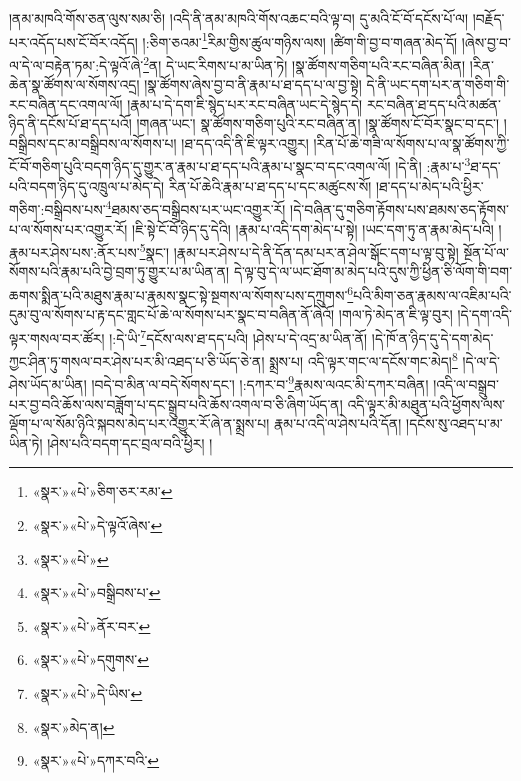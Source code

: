 །ནམ་མཁའི་གོས་ཅན་ལུས་སམ་ཅི། །འདི་ནི་ནམ་མཁའི་གོས་འཆང་བའི་ལྟ་བ། དུ་མའི་ངོ་བོ་དངོས་པོ་ལ། །བརྗོད་པར་འདོད་པས་ངོ་བོར་འདོད། །:ཅིག་ཅའམ་\footnote{«སྣར་»«པེ་»ཅིག་ཅར་རམ་}རིམ་གྱིས་ཚུལ་གཉིས་ལས། །ཚིག་གི་བྱ་བ་གཞན་མེད་དོ། །ཞེས་བྱ་བ་ལ་དེ་ལ་བརྟེན་ཏམ་:དེ་ལྟའོ་ཞེ་\footnote{«སྣར་»«པེ་»དེ་ལྟའོ་ཞེས་}ན། དེ་ཡང་རིགས་པ་མ་ཡིན་ཏེ། །སྣ་ཚོགས་གཅིག་པའི་རང་བཞིན་མིན། །རིན་ཆེན་སྣ་ཚོགས་ལ་སོགས་འདྲ། །སྣ་ཚོགས་ཞེས་བྱ་བ་ནི་རྣམ་པ་ཐ་དད་པ་ལ་བྱ་སྟེ། དེ་ནི་ཡང་དག་པར་ན་གཅིག་གི་རང་བཞིན་དང་འགལ་ལོ། །རྣམ་པ་དེ་དག་ཇི་སྙེད་པར་རང་བཞིན་ཡང་དེ་སྙེད་དེ། རང་བཞིན་ཐ་དད་པའི་མཚན་ཉིད་ནི་དངོས་པོ་ཐ་དད་པའོ། །གཞན་ཡང་། སྣ་ཚོགས་གཅིག་པུའི་རང་བཞིན་ན། །སྣ་ཚོགས་ངོ་བོར་སྣང་བ་དང་། །བསྒྲིབས་དང་མ་བསྒྲིབས་ལ་སོགས་པ། །ཐ་དད་འདི་ནི་ཇི་ལྟར་འགྱུར། །རིན་པོ་ཆེ་གཟི་ལ་སོགས་པ་ལ་སྣ་ཚོགས་ཀྱི་ངོ་བོ་གཅིག་པུའི་བདག་ཉིད་དུ་གྱུར་ན་རྣམ་པ་ཐ་དད་པའི་རྣམ་པ་སྣང་བ་དང་འགལ་ལོ། །དེ་ནི། :རྣམ་པ་\footnote{«སྣར་»«པེ་»}ཐ་དད་པའི་བདག་ཉིད་དུ་འཁྲུལ་པ་མེད་དེ། རིན་པོ་ཆེའི་རྣམ་པ་ཐ་དད་པ་དང་མཚུངས་སོ། །ཐ་དད་པ་མེད་པའི་ཕྱིར་གཅིག་:བསྒྲིབས་པས་\footnote{«སྣར་»«པེ་»བསྒྲིབས་པ་}ཐམས་ཅད་བསྒྲིབས་པར་ཡང་འགྱུར་རོ། །དེ་བཞིན་དུ་གཅིག་རྟོགས་པས་ཐམས་ཅད་རྟོགས་པ་ལ་སོགས་པར་འགྱུར་རོ། །ཇི་སྟེ་ངོ་བོ་ཉིད་དུ་དེའི། །རྣམ་པ་འདི་དག་མེད་པ་སྟེ། །ཡང་དག་ཏུ་ན་རྣམ་མེད་པའི། །རྣམ་པར་ཤེས་པས་:ནོར་པས་\footnote{«སྣར་»«པེ་»ནོར་བར་}སྣང་། །རྣམ་པར་ཤེས་པ་དེ་ནི་དོན་དམ་པར་ན་ཤེལ་སྒོང་དག་པ་ལྟ་བུ་སྟེ། སྔོན་པོ་ལ་སོགས་པའི་རྣམ་པའི་བྱེ་བྲག་ཏུ་གྱུར་པ་མ་ཡིན་ན། དེ་ལྟ་བུ་དེ་ལ་ཡང་ཐོག་མ་མེད་པའི་དུས་ཀྱི་ཕྱིན་ཅི་ལོག་གི་བག་ཆགས་སྨིན་པའི་མཐུས་རྣམ་པ་རྣམས་སྣང་སྟེ་སྔགས་ལ་སོགས་པས་དཀྲུགས་\footnote{«སྣར་»«པེ་»དགུགས་}པའི་མིག་ཅན་རྣམས་ལ་འཇིམ་པའི་དུམ་བུ་ལ་སོགས་པ་རྟ་དང་གླང་པོ་ཆེ་ལ་སོགས་པར་སྣང་བ་བཞིན་ནོ་ཞེའོ། །གལ་ཏེ་མེད་ན་ཇི་ལྟ་བུར། །དེ་དག་འདི་ལྟར་གསལ་བར་ཚོར། །:དེ་ཡི་\footnote{«སྣར་»«པེ་»དེ་ཡིས་}དངོས་ལས་ཐ་དད་པའི། །ཤེས་པ་དེ་འདྲ་མ་ཡིན་ནོ། །དེ་ཁོ་ན་ཉིད་དུ་དེ་དག་མེད་ཀྱང་ཤིན་ཏུ་གསལ་བར་ཤེས་པར་མི་འཐད་པ་ཅི་ཡོད་ཅེ་ན། སྨྲས་པ། འདི་ལྟར་གང་ལ་དངོས་གང་མེད།\footnote{«སྣར་»མེད་ན།} །དེ་ལ་དེ་ཤེས་ཡོད་མ་ཡིན། །བདེ་བ་མིན་ལ་བདེ་སོགས་དང་། །:དཀར་བ་\footnote{«སྣར་»«པེ་»དཀར་བའི་}རྣམས་ལའང་མི་དཀར་བཞིན། །འདི་ལ་བསྒྲུབ་པར་བྱ་བའི་ཆོས་ལས་བཟློག་པ་དང་སྒྲུབ་པའི་ཆོས་འགལ་བ་ཅི་ཞིག་ཡོད་ན། འདི་ལྟར་མི་མཐུན་པའི་ཕྱོགས་ལས་ལྡོག་པ་ལ་སོམ་ཉིའི་སྐབས་མེད་པར་འགྱུར་རོ་ཞེ་ན་སྨྲས་པ། རྣམ་པ་འདི་ལ་ཤེས་པའི་དོན། །དངོས་སུ་འཐད་པ་མ་ཡིན་ཏེ། །ཤེས་པའི་བདག་དང་བྲལ་བའི་ཕྱིར། །
